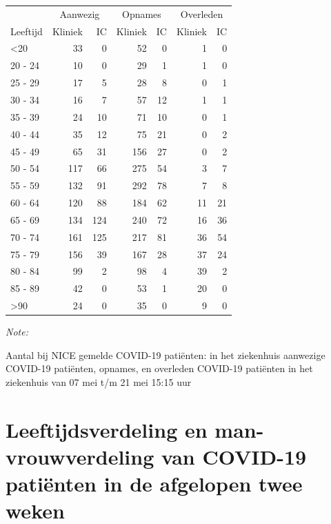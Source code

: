 \documentclass[
  english,
  man,floatsintext]{apa6}
\begin{document}
\begin{table}
\centering\begingroup\fontsize{10}{12}\selectfont

\begin{threeparttable}
\begin{tabular}{lrrrrrr}
\toprule
\multicolumn{1}{c}{ } & \multicolumn{2}{c}{Aanwezig} & \multicolumn{2}{c}{Opnames} & \multicolumn{2}{c}{Overleden} \\
\cmidrule(l{3pt}r{3pt}){2-3} \cmidrule(l{3pt}r{3pt}){4-5} \cmidrule(l{3pt}r{3pt}){6-7}
Leeftijd & Kliniek & IC & Kliniek & IC & Kliniek & IC\\
\midrule
<20 & 33 & 0 & 52 & 0 & 1 & 0\\
20 - 24 & 10 & 0 & 29 & 1 & 1 & 0\\
25 - 29 & 17 & 5 & 28 & 8 & 0 & 1\\
30 - 34 & 16 & 7 & 57 & 12 & 1 & 1\\
35 - 39 & 24 & 10 & 71 & 10 & 0 & 1\\
40 - 44 & 35 & 12 & 75 & 21 & 0 & 2\\
45 - 49 & 65 & 31 & 156 & 27 & 0 & 2\\
50 - 54 & 117 & 66 & 275 & 54 & 3 & 7\\
55 - 59 & 132 & 91 & 292 & 78 & 7 & 8\\
60 - 64 & 120 & 88 & 184 & 62 & 11 & 21\\
65 - 69 & 134 & 124 & 240 & 72 & 16 & 36\\
70 - 74 & 161 & 125 & 217 & 81 & 36 & 54\\
75 - 79 & 156 & 39 & 167 & 28 & 37 & 24\\
80 - 84 & 99 & 2 & 98 & 4 & 39 & 2\\
85 - 89 & 42 & 0 & 53 & 1 & 20 & 0\\
>90 & 24 & 0 & 35 & 0 & 9 & 0\\
\bottomrule
\end{tabular}
\begin{tablenotes}
\item \textit{Note: } 
\item Aantal bij NICE gemelde COVID-19 patiënten: in het ziekenhuis aanwezige COVID-19 patiënten, opnames, en overleden COVID-19 patiënten in het ziekenhuis van 07 mei t/m 21 mei 15:15 uur
\end{tablenotes}
\end{threeparttable}
\endgroup{}
\end{table}

\newpage

\hypertarget{leeftijdsverdeling-en-man-vrouwverdeling-van-covid-19-patiuxebnten-in-de-afgelopen-twee-weken}{%
\section{Leeftijdsverdeling en man-vrouwverdeling van COVID-19 patiënten in de afgelopen twee weken}\label{leeftijdsverdeling-en-man-vrouwverdeling-van-covid-19-patiuxebnten-in-de-afgelopen-twee-weken}}
\end{document}
